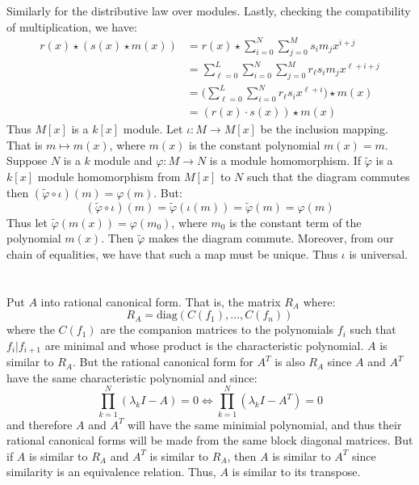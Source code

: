\documentclass[crop=false,class=article]{standalone}                           %
\begin{document}
        Similarly for the distributive law over modules. Lastly, checking the
        compatibility of multiplication, we have:
        \begin{subequations}
            \begin{align}
                r(x)\star(s(x)\star{m}(x))
                &=r(x)\star\sum_{i=0}^{N}\sum_{j=0}^{M}s_{i}m_{j}x^{i+j}\\
                &=\sum_{\ell=0}^{L}\sum_{i=0}^{N}\sum_{j=0}^{M}
                    r_{\ell}s_{i}m_{j}x^{\ell+i+j}\\
                &=\Big(\sum_{\ell=0}^{L}\sum_{i=0}^{N}
                    r_{\ell}s_{i}x^{\ell+i}\Big)\star{m}(x)\\
                &=(r(x)\cdot{s}(x))\star{m}(x)
            \end{align}
        \end{subequations}
        Thus $M[x]$ is a $k[x]$ module. Let $\iota:M\rightarrow{M}[x]$ be the
        inclusion mapping. That is $m\mapsto{m}(x)$, where $m(x)$ is the
        constant polynomial $m(x)=m$. Suppose $N$ is a $k$ module and
        $\varphi:M\rightarrow{N}$ is a module homomorphism. If $\tilde{\varphi}$
        is a $k[x]$ module homomorphism from $M[x]$ to $N$ such that the diagram
        commutes then $(\tilde{\varphi}\circ\iota)(m)=\varphi(m)$. But:
        \begin{equation}
            (\tilde{\varphi}\circ\iota)(m)
            =\tilde{\varphi}(\iota(m))
            =\tilde{\varphi}(m)
            =\varphi(m)
        \end{equation}
        Thus let $\tilde{\varphi}(m(x))=\varphi(m_{0})$, where $m_{0}$ is the
        constant term of the polynomial $m(x)$. Then $\tilde{\varphi}$ makes the
        diagram commute. Moreover, from our chain of equalities, we have that
        such a map must be unique. Thus $\iota$ is universal.
    \section{}
        Put $A$ into rational canonical form. That is, the matrix $R_{A}$ where:
        \begin{equation}
            R_{A}=\textrm{diag}(C(f_{1}),\dots,C(f_{n}))
        \end{equation}
        where the $C(f_{1})$ are the companion matrices to the polynomials
        $f_{i}$ such that $f_{i}|f_{i+1}$ are minimal and whose product is the
        characteristic polynomial. $A$ is similar to $R_{A}$. But the rational
        canonical form for $A^{T}$ is also $R_{A}$ since $A$ and $A^{T}$ have
        the same characteristic polynomial and since:
        \begin{equation}
            \prod_{k=1}^{N}(\lambda_{k}I-A)=0
            \Leftrightarrow\prod_{k=1}^{N}(\lambda_{k}I-A^{T})=0
        \end{equation}
        and therefore $A$ and $A^{T}$ will have the same minimial polynomial,
        and thus their rational canonical forms will be made from the same
        block diagonal matrices. But if $A$ is similar to $R_{A}$ and
        $A^{T}$ is similar to $R_{A}$, then $A$ is similar to $A^{T}$ since
        similarity is an equivalence relation. Thus, $A$ is similar to its
        transpose.
\end{document}
